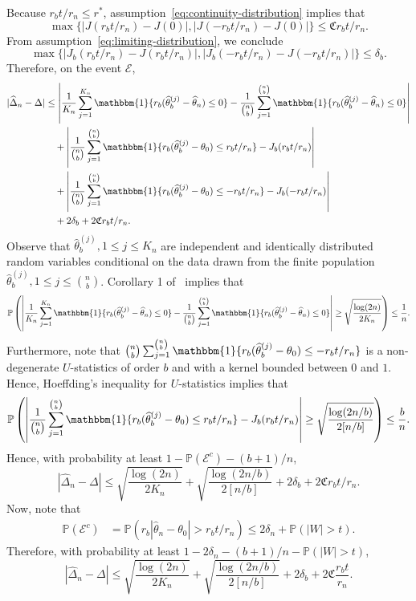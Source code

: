 \documentclass{article}
\numberwithin{myalgctr}{section}
\begin{document}
Because $r_bt/r_n \le r^*$, assumption~\ref{eq:continuity-distribution} implies that
\[
\max\{|J(r_bt/r_n) - J(0)|, |J(-r_bt/r_n) - J(0)|\} \le \mathfrak{C}r_bt/r_n.
\]
From assumption~\ref{eq:limiting-distribution}, we conclude
\[
\max\{|J_b(r_bt/r_n) - J(r_bt/r_n)|, |J_b(-r_bt/r_n) - J(-r_bt/r_n)|\} \le \delta_b.
\]
Therefore, on the event $\mathcal{E}$,
\begin{equation}
\begin{split}
|\widehat{\Delta}_n - \Delta| &\le \left|\frac{1}{K_n}\sum_{j=1}^{K_n} \mathbbm{1}\{r_b(\widehat{\theta}_b^{(j)} - \widehat{\theta}_n) \le 0\} - \frac{1}{\binom{n}{b}}\sum_{j=1}^{\binom{n}{b}} \mathbbm{1}\{r_b(\widehat{\theta}_b^{(j)} - \widehat{\theta}_n) \le 0\}\right|\\
&\quad+ \left|\frac{1}{\binom{n}{b}}\sum_{j=1}^{\binom{n}{b}} \mathbbm{1}\{r_b(\widehat{\theta}_b^{(j)} - \theta_0) \le r_bt/r_n\} - J_b(r_bt/r_n)\right|\\
&\quad+ \left|\frac{1}{\binom{n}{b}}\sum_{j=1}^{\binom{n}{b}} \mathbbm{1}\{r_b(\widehat{\theta}_b^{(j)} - \theta_0) \le -r_bt/r_n\} - J_b(-r_bt/r_n)\right|\\
&\quad+ 2\delta_b + 2\mathfrak{C}r_bt/r_n.
\end{split}
\end{equation}
Observe that $\widehat{\theta}_b^{(j)}, 1\le j\le K_n$ are independent and identically distributed random variables conditional on the data drawn from the finite population $\widehat{\theta}_b^{(j)}, 1\le j\le \binom{n}{b}$. Corollary 1 of~\cite{massart1990tight} implies that
\[
\mathbb{P}\left(\left|\frac{1}{K_n}\sum_{j=1}^{K_n} \mathbbm{1}\{r_b(\widehat{\theta}_b^{(j)} - \widehat{\theta}_n) \le 0\} - \frac{1}{\binom{n}{b}}\sum_{j=1}^{\binom{n}{b}} \mathbbm{1}\{r_b(\widehat{\theta}_b^{(j)} - \widehat{\theta}_n) \le 0\}\right| \ge \sqrt{\frac{\log(2n)}{2K_n}}\right) \le \frac{1}{n}.
\]
Furthermore, note that $\binom{n}{b}\sum_{j=1}^{\binom{n}{b}}\mathbbm{1}\{r_b(\widehat{\theta}_b^{(j)} - \theta_0) \le -r_bt/r_n\}$ is a non-degenerate $U$-statistics of order $b$ and with a kernel bounded between $0$ and $1$. Hence, Hoeffding's inequality for $U$-statistics \citep[inequality (5.7)]{hoeffding1963probability} implies that
\[
\mathbb{P}\left(\left|\frac{1}{\binom{n}{b}}\sum_{j=1}^{\binom{n}{b}} \mathbbm{1}\{r_b(\widehat{\theta}_b^{(j)} - \theta_0) \le r_bt/r_n\} - J_b(r_bt/r_n)\right| \ge \sqrt{\frac{\log(2n/b)}{2[n/b]}}\right) \le \frac{b}{n}.
\] 
Hence, with probability at least $1 - \mathbb{P}(\mathcal{E}^c) - (b + 1)/n$,
\[
|\widehat{\Delta}_n - \Delta| \le \sqrt{\frac{\log(2n)}{2K_n}} + \sqrt{\frac{\log(2n/b)}{2[n/b]}} + 2\delta_b + 2\mathfrak{C}r_bt/r_n.
\]
Now, note that 
\begin{align*}
\mathbb{P}(\mathcal{E}^c) &= \mathbb{P}(r_b|\widehat{\theta}_n - \theta_0| > r_bt/r_n) \le 2\delta_n + \mathbb{P}(|W| > t).
\end{align*}
Therefore, with probability at least $1 - 2\delta_n - (b + 1)/n - \mathbb{P}(|W| > t)$,
\[
|\widehat{\Delta}_n - \Delta| \le \sqrt{\frac{\log(2n)}{2K_n}} + \sqrt{\frac{\log(2n/b)}{2[n/b]}} + 2\delta_b + 2\mathfrak{C}\frac{r_bt}{r_n}.
\]
\end{document}

